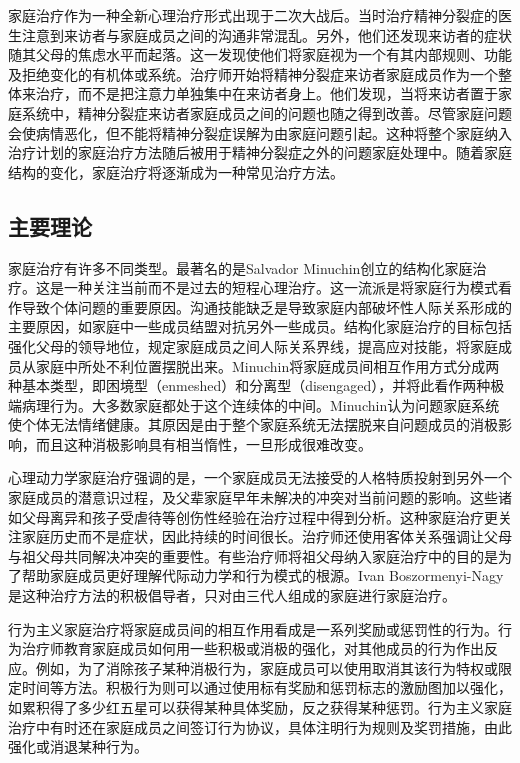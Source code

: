 家庭治疗作为一种全新心理治疗形式出现于二次大战后。当时治疗精神分裂症的医生注意到来访者与家庭成员之间的沟通非常混乱。另外，他们还发现来访者的症状随其父母的焦虑水平而起落。这一发现使他们将家庭视为一个有其内部规则、功能及拒绝变化的有机体或系统。治疗师开始将精神分裂症来访者家庭成员作为一个整体来治疗，而不是把注意力单独集中在来访者身上。他们发现，当将来访者置于家庭系统中，精神分裂症来访者家庭成员之间的问题也随之得到改善。尽管家庭问题会使病情恶化，但不能将精神分裂症误解为由家庭问题引起。这种将整个家庭纳入治疗计划的家庭治疗方法随后被用于精神分裂症之外的问题家庭处理中。随着家庭结构的变化，家庭治疗将逐渐成为一种常见治疗方法。

\subsection{主要理论}

家庭治疗有许多不同类型。最著名的是Salvador
Minuchin创立的结构化家庭治疗。这是一种关注当前而不是过去的短程心理治疗。这一流派是将家庭行为模式看作导致个体问题的重要原因。沟通技能缺乏是导致家庭内部破坏性人际关系形成的主要原因，如家庭中一些成员结盟对抗另外一些成员。结构化家庭治疗的目标包括强化父母的领导地位，规定家庭成员之间人际关系界线，提高应对技能，将家庭成员从家庭中所处不利位置摆脱出来。Minuchin将家庭成员间相互作用方式分成两种基本类型，即困境型（enmeshed）和分离型（disengaged），并将此看作两种极端病理行为。大多数家庭都处于这个连续体的中间。Minuchin认为问题家庭系统使个体无法情绪健康。其原因是由于整个家庭系统无法摆脱来自问题成员的消极影响，而且这种消极影响具有相当惰性，一旦形成很难改变。

心理动力学家庭治疗强调的是，一个家庭成员无法接受的人格特质投射到另外一个家庭成员的潜意识过程，及父辈家庭早年未解决的冲突对当前问题的影响。这些诸如父母离异和孩子受虐待等创伤性经验在治疗过程中得到分析。这种家庭治疗更关注家庭历史而不是症状，因此持续的时间很长。治疗师还使用客体关系强调让父母与祖父母共同解决冲突的重要性。有些治疗师将祖父母纳入家庭治疗中的目的是为了帮助家庭成员更好理解代际动力学和行为模式的根源。Ivan
Boszormenyi-Nagy是这种治疗方法的积极倡导者，只对由三代人组成的家庭进行家庭治疗。

行为主义家庭治疗将家庭成员间的相互作用看成是一系列奖励或惩罚性的行为。行为治疗师教育家庭成员如何用一些积极或消极的强化，对其他成员的行为作出反应。例如，为了消除孩子某种消极行为，家庭成员可以使用取消其该行为特权或限定时间等方法。积极行为则可以通过使用标有奖励和惩罚标志的激励图加以强化，如累积得了多少红五星可以获得某种具体奖励，反之获得某种惩罚。行为主义家庭治疗中有时还在家庭成员之间签订行为协议，具体注明行为规则及奖罚措施，由此强化或消退某种行为。

